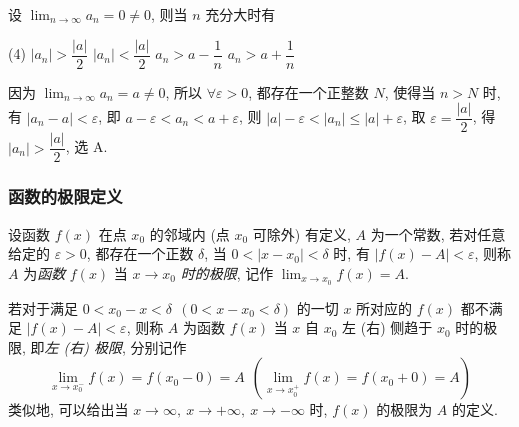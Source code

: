 \begin{example}[2014 数三]
    设 $\displaystyle\lim_{n\to\infty}a_n=0\neq 0$, 则当 $n$ 充分大时有
    \begin{tasks}(4)
        \task $|a_n|>\dfrac{|a|}{2}$
        \task $|a_n|<\dfrac{|a|}{2}$
        \task $a_n>a-\dfrac{1}{n}$
        \task $a_n>a+\dfrac{1}{n}$
    \end{tasks}
\end{example}
\begin{solution}
    因为 $\displaystyle\lim_{n\to\infty}a_n=a\neq 0$, 所以 $\forall\varepsilon>0$, 都存在一个正整数 $N$, 使得当 $n>N$ 时, 有 $|a_n-a|<\varepsilon$, 
    即 $a-\varepsilon<a_n<a+\varepsilon$, 则 $|a|-\varepsilon<|a_n|\leqslant |a|+\varepsilon$, 取 $\varepsilon=\dfrac{|a|}{2}$, 得 $|a_n|>\dfrac{|a|}{2}$, 选 A.
\end{solution}

\subsubsection{函数的极限定义}

\begin{definition}[函数的极限]
    设函数 $f(x)$ 在点 $x_0$ 的邻域内 (点 $x_0$ 可除外) 有定义, $A$ 为一个常数, 若对任意给定的 $\varepsilon>0$, 都存在一个正数 $\delta$, 
    当 $0<|x-x_0|<\delta$ 时, 有 $|f(x)-A|<\varepsilon$, 则称 $A$ 为\textit{函数} $f(x)$ 当 $x\to x_0$ \textit{时的极限}, 记作 $\displaystyle\lim_{x\to x_0}f(x)=A.$
\end{definition}

\begin{definition}[左右极限]
    若对于满足 $0<x_0-x<\delta~~(0<x-x_0<\delta)$ 的一切 $x$ 所对应的 $f(x)$ 都不满足 $|f(x)-A|<\varepsilon$, 则称 $A$ 为函数 $f(x)$ 当 $x$ 自 $x_0$ 左 (右) 侧趋于 $x_0$ 时的极限, 即\textit{左 (右) 极限}, 
    分别记作 $$\lim_{x\to x_0^-}f(x)=f(x_0-0)=A~~(\lim_{x\to x_0^+}f(x)=f(x_0+0)=A)$$
    类似地, 可以给出当 $x\to\infty,~x\to+\infty,~x\to-\infty$ 时, $f(x)$ 的极限为 $A$ 的定义.
\end{definition}

